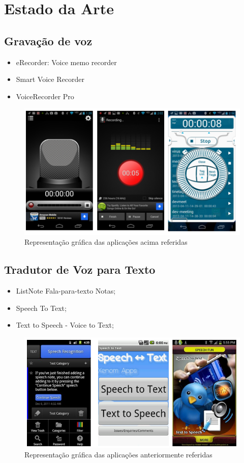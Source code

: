 \documentclass[a4paper,titlepage]{article}
\begin{document}
	
	
	\newpage
	
	\section{Estado da Arte}
		\subsection{Gravação de voz}
			\begin{itemize}
				\item eRecorder: Voice memo recorder
				\item Smart Voice Recorder
				\item VoiceRecorder Pro
			\end{itemize}
			\begin{figure}[h]
				\centering
				\includegraphics[width=0.7\linewidth]{./imagens1}
				\caption{ Representação gráfica das aplicações acima referidas}
				\label{fig:imagens1}
			\end{figure}
		\subsection{Tradutor de Voz para Texto}	
			\begin{itemize}
				\item ListNote Fala-para-texto Notas;
				\item Speech To Text;
				\item Text to Speech - Voice to Text; 
			\end{itemize}
			
			\begin{figure}[h]
\centering
\includegraphics[width=0.7\linewidth]{./imagens2}
\caption{Representação gráfica das aplicações anteriormente referidas}
\label{fig:imagens2}
\end{figure}
\end{document}
